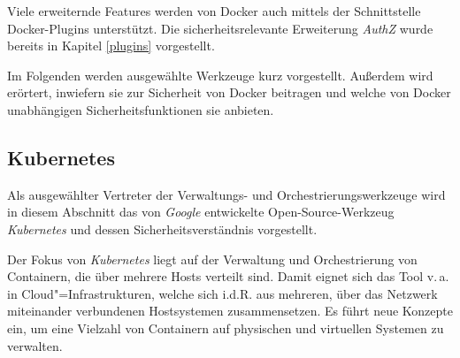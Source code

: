 \documentclass[../main.tex]{subfiles}
\begin{document}
    Viele erweiternde Features werden von Docker auch mittels der Schnittstelle Docker-Plugins unterstützt. Die sicherheitsrelevante Erweiterung \emph{AuthZ} wurde bereits in Kapitel \ref{plugins} vorgestellt.

    Im Folgenden werden ausgewählte Werkzeuge kurz vorgestellt. Außerdem wird erörtert, inwiefern sie zur Sicherheit von Docker beitragen und welche von Docker unabhängigen Sicherheitsfunktionen sie anbieten.



    \subsection{Kubernetes}
      Als ausgewählter Vertreter der Verwaltungs- und Orchestrierungswerkzeuge wird in diesem Abschnitt das von \emph{Google} entwickelte Open-Source-Werkzeug \emph{Kubernetes} und dessen Sicherheitsverständnis vorgestellt.

      Der Fokus von \emph{Kubernetes} liegt auf der Verwaltung und Orchestrierung von Containern, die über mehrere Hosts verteilt sind. Damit eignet sich das Tool v.\,a. in Cloud"=Infrastrukturen, welche sich i.d.R. aus mehreren, über das Netzwerk miteinander verbundenen Hostsystemen zusammensetzen. Es führt neue Konzepte ein, um eine Vielzahl von Containern auf physischen und virtuellen Systemen zu verwalten.

\end{document}
